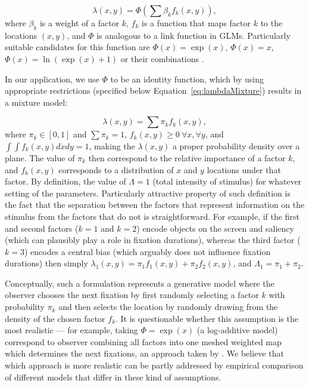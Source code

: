 \documentclass{article}
\begin{document}
\begin{equation}
    \lambda(x, y) = \Phi \left(\sum \beta_k f_k(x, y) \right),
\end{equation}
where $\beta_k$ is a weight of a factor $k$, $f_k$ is a function that maps factor $k$ to the locations $(x, y)$, and $\Phi$ is analogous to a link function in GLMs. Particularly suitable candidates for this function are $\Phi (x) = \exp(x)$, $\Phi (x) = x$, $\Phi (x) = \ln(\exp(x) + 1)$ or their combinations \citep[see ][for the discussion of the differences between them]{barthelme2013spatial}. 

In our application, we use $\Phi$ to be an identity function, which by using appropriate restrictions (specified below Equation~\ref{eq:lambdaMixture}) results in a mixture model:

\begin{equation}
\label{eq:lambdaMixture}
    \lambda(x, y) = \sum \pi_k f_k(x, y),
\end{equation}
where $\pi_k \in [0, 1]$ and $\sum \pi_k = 1$, $f_k(x, y) \geq 0~\forall x, \forall y$, and $\int \int f_k(x, y) dx dy = 1$, making the $\lambda(x, y)$ a proper probability density over a plane. The value of $\pi_k$ then correspond to the relative importance of a factor $k$, and $f_k(x, y)$ corresponds to a distribution of $x$ and $y$ locations under that factor. By definition, the value of $\Lambda = 1$ (total intensity of stimulus) for whatever setting of the parameters. Particularly attractive property of such definition is the fact that the separation between the factors that represent information on the stimulus from the factors that do not is straightforward. For example, if the first and second factors ($k=1$ and $k=2$) encode objects on the screen and saliency (which can plausibly play a role in fixation durations), whereas the third factor ($k=3$) encodes a central bias (which arguably does not influence fixation durations) then simply $\lambda_1(x, y) = \pi_1 f_1(x, y) + \pi_2 f_2(x, y)$, and $\Lambda_1 = \pi_1 + \pi_2$.

Conceptually, such a formulation represents a generative model where the observer chooses the next fixation by first randomly selecting a factor $k$ with probability $\pi_k$ and then selects the location by randomly drawing from the density of the chosen factor $f_k$. It is questionable whether this assumption is the most realistic --- for example, taking $\Phi = \exp(x)$ (a log-additive model) correspond to observer combining all factors into one meshed weighted map which determines the next fixations, an approach taken by \citet{barthelme2013spatial}. We believe that which approach is more realistic can be partly addressed by empirical comparison of different models that differ in these kind of assumptions.
\end{document}
